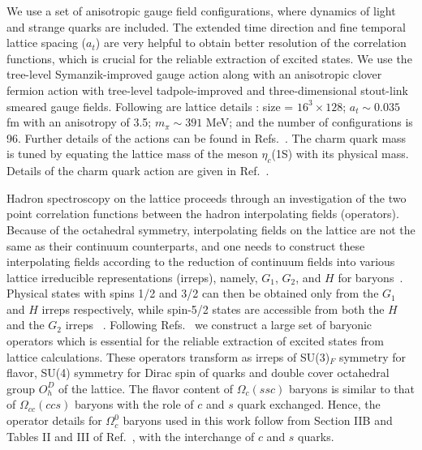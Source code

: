 \documentclass[showkeys,aps,twocolumn,showpacs,preprintnumbers,amsmath,amssymb,prd,letterpaper,floatfix,nofootinbib,superscriptaddress,]{revtex4-1}
\begin{document}
 
We use a set of anisotropic gauge field configurations, where dynamics
of light and strange quarks are included.  The extended
time direction and fine temporal lattice spacing ($a_t$) are very
helpful to obtain better resolution of the correlation functions,
which is crucial for the reliable extraction of excited states. We use the tree-level Symanzik-improved gauge action
along with an anisotropic clover fermion action with tree-level
tadpole-improved and three-dimensional stout-link smeared gauge
fields. Following are lattice details : size = $16^3\times 128$; $a_t 
\sim 0.035$ fm with an anisotropy of 3.5; $m_{\pi} \sim 391$ MeV;
and the number of configurations is 96. Further details of the actions 
can be found
in Refs.~\cite{Edwards:2008ja, Lin:2008pr}.  The charm quark mass is
tuned by equating the lattice mass of the meson $\eta_c$(1S) with its
physical mass. Details of the charm quark action
are given in Ref.~\cite{Liu:2012ze}.

Hadron spectroscopy on the lattice proceeds through an investigation of the two 
point correlation functions between the 
hadron interpolating fields (operators). 
Because of the octahedral symmetry, interpolating fields on the lattice are not the same as their continuum counterparts, and one needs to construct these interpolating fields according to the reduction of continuum fields into various lattice irreducible representations (irreps), namely, $G_1$, $G_2$, and $H$ for baryons~\cite{Johnson:1982yq}. Physical states with spins 1/2 and 
3/2 can then be obtained only from the $G_1$ and $H$ irreps respectively, while spin-5/2 states are accessible from both the $H$ and the $G_2$ irreps ~\cite{Johnson:1982yq}.
Following Refs.~\cite{Basak:2005ir,Edwards:2011jj} we construct a large set of
  baryonic operators which is essential for the 
reliable extraction of excited states from lattice calculations. 
 These operators transform as irreps of SU(3)$_F$ symmetry 
for flavor, SU(4) symmetry for Dirac spin of 
quarks and double cover octahedral group $O^D_h$ of the
lattice.
 The flavor content of $\Omega_c (ssc)$ baryons
is similar to that of $\Omega_{cc} (ccs)$ baryons with the role of
$c$ and $s$ quark exchanged. Hence, the operator details for $\Omega_c^0$
baryons used in this work follow from Section IIB and Tables II
and III of %
 Ref.~\cite{Padmanath:2015jea}, with the interchange of $c$ and $s$ quarks.
\end{document}
